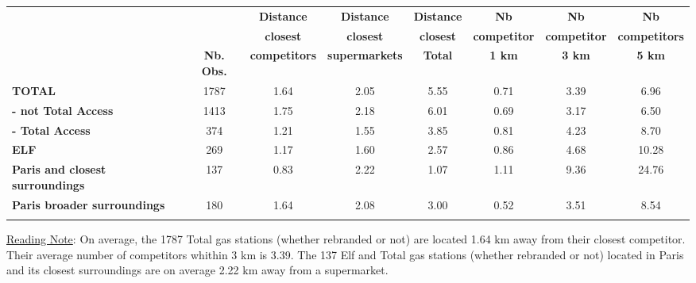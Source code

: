 \documentclass[english]{article}
\begin{document}
\begin{center}
\begin{scriptsize} %
\begin{tabular}{lccccccc}
 &  &  &  &  &  &  & \tabularnewline
\hline
\hline
{\tiny{}{} } &  & \textbf{\tiny{}Distance}{\tiny{} } & \textbf{\tiny{}Distance}{\tiny{} } & \textbf{\tiny{}Distance}{\tiny{} } & \textbf{\tiny{}Nb}{\tiny{} } & \textbf{\tiny{}Nb}{\tiny{} } & \textbf{\tiny{}Nb }\tabularnewline
{\tiny{}{} } &  & \textbf{\tiny{}closest}{\tiny{} } & \textbf{\tiny{}closest}{\tiny{} } & \textbf{\tiny{}closest}{\tiny{} } & \textbf{\tiny{}competitor}{\tiny{} } & \textbf{\tiny{}competitor}{\tiny{} } & \textbf{\tiny{}competitors}\tabularnewline
{\tiny{}{} } & \textbf{\tiny{}Nb. Obs.}{\tiny{} } & \textbf{\tiny{}competitors}{\tiny{} } & \textbf{\tiny{}supermarkets}{\tiny{} } & \textbf{\tiny{}Total}{\tiny{} } & \textbf{\tiny{}1 km}{\tiny{} } & \textbf{\tiny{}3 km}{\tiny{} } & \textbf{\tiny{}5 km }\tabularnewline
\hline
\textbf{\tiny{}TOTAL}{\tiny{} } & {\tiny{}1787 } & {\tiny{}1.64 } & {\tiny{}2.05 } & {\tiny{}5.55 } & {\tiny{}0.71 } & {\tiny{}3.39 } & {\tiny{}6.96 }\tabularnewline
\textbf{\tiny{}- not Total Access}{\tiny{} } & {\tiny{}1413 } & {\tiny{}1.75 } & {\tiny{}2.18 } & {\tiny{}6.01 } & {\tiny{}0.69 } & {\tiny{}3.17 } & {\tiny{}6.50 }\tabularnewline
\textbf{\tiny{}- Total Access}{\tiny{} } & {\tiny{}374 } & {\tiny{}1.21 } & {\tiny{}1.55 } & {\tiny{}3.85 } & {\tiny{}0.81 } & {\tiny{}4.23 } & {\tiny{}8.70 }\tabularnewline
\hline
\textbf{\tiny{}ELF}{\tiny{} } & {\tiny{}269 } & {\tiny{}1.17 } & {\tiny{}1.60 } & {\tiny{}2.57 } & {\tiny{}0.86 } & {\tiny{}4.68 } & {\tiny{}10.28 }\tabularnewline
\hline
\textbf{\tiny{}Paris and closest surroundings}{\tiny{} } & {\tiny{}137 } & {\tiny{}0.83 } & {\tiny{}2.22 } & {\tiny{}1.07 } & {\tiny{}1.11 } & {\tiny{}9.36 } & {\tiny{}24.76}\tabularnewline
\textbf{\tiny{}Paris broader surroundings}{\tiny{} } & {\tiny{}180 } & {\tiny{}1.64 } & {\tiny{}2.08 } & {\tiny{}3.00 } & {\tiny{}0.52 } & {\tiny{}3.51 } & {\tiny{}8.54}\tabularnewline
\hline
\hline
 &  &  &  &  &  &  & \tabularnewline
\end{tabular}\end{scriptsize}
\par\end{center}

{\small{}\uline{Reading Note}}{\small{}: }On average, the 1787 Total gas stations (whether rebranded or not) are located 1.64 km away from their closest competitor. Their average number of competitors whithin 3 km is 3.39. The 137 Elf and Total gas stations (whether rebranded or not) located in Paris and its closest surroundings are on average 2.22 km away from a supermarket.
\medskip{}
\end{document}
